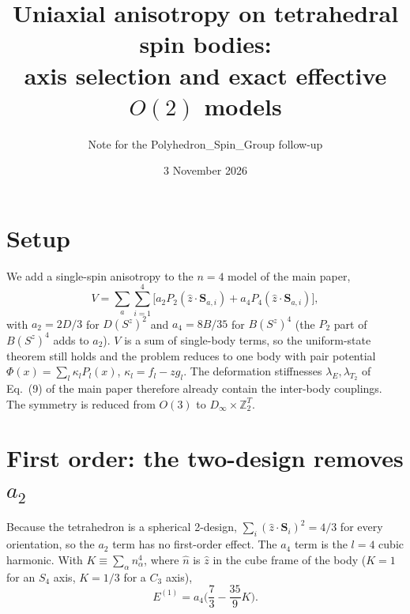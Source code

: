 \documentclass[11pt]{article}
\title{Uniaxial anisotropy on tetrahedral spin bodies:\\
axis selection and exact effective $O(2)$ models}
\author{Note for the Polyhedron\_Spin\_Group follow-up}
\date{3 November 2026}
\begin{document}
\maketitle

\section{Setup}
We add a single-spin anisotropy to the $n=4$ model of the main paper,
\begin{equation}
V=\sum_a\sum_{i=1}^{4}\big[a_2P_2(\hat z\cdot\mathbf S_{a,i})+a_4P_4(\hat z\cdot\mathbf S_{a,i})\big],
\end{equation}
with $a_2=2D/3$ for $D(S^z)^2$ and $a_4=8B/35$ for $B(S^z)^4$ (the $P_2$ part of
$B(S^z)^4$ adds to $a_2$). $V$ is a sum of single-body terms, so the uniform-state
theorem still holds and the problem reduces to one body with pair potential
$\Phi(x)=\sum_l\kappa_lP_l(x)$, $\kappa_l=f_l-zg_l$. The deformation stiffnesses
$\lambda_E,\lambda_{T_2}$ of Eq.~(9) of the main paper therefore already contain the
inter-body couplings. The symmetry is reduced from $O(3)$ to $D_\infty\times\mathbb Z_2^T$.

\section{First order: the two-design removes $a_2$}
Because the tetrahedron is a spherical 2-design, $\sum_i(\hat z\cdot\mathbf S_i)^2=4/3$
for every orientation, so the $a_2$ term has no first-order effect. The $a_4$ term
is the $l=4$ cubic harmonic. With $K\equiv\sum_\alpha n_\alpha^4$, where $\hat n$ is
$\hat z$ in the cube frame of the body ($K=1$ for an $S_4$ axis, $K=1/3$ for a $C_3$
axis),
\begin{equation}
E^{(1)}=a_4\Big(\frac73-\frac{35}{9}K\Big).
\end{equation}
\end{document}
